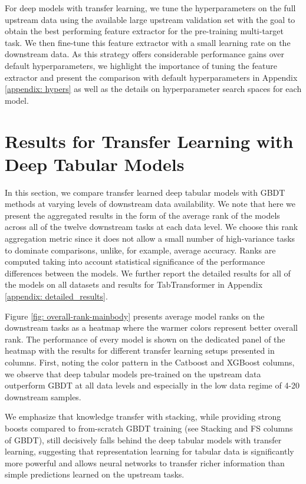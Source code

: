 For deep models with transfer learning, we tune the hyperparameters on the full upstream data using the available large upstream validation set with the goal to obtain the best performing feature extractor for the pre-training multi-target task. We then fine-tune this feature extractor with a small learning rate on the downstream data. As this strategy offers considerable performance gains over default hyperparameters, we highlight the importance of tuning the feature extractor and present the comparison with default hyperparameters in Appendix \ref{appendix: hypers} as well as the details on hyperparameter search spaces for each model.

\section{Results for Transfer Learning with Deep Tabular Models}\label{mainbody: main_results}

In this section, we compare transfer learned deep tabular models with GBDT methods at varying levels of downstream data availability. We note that here we present the aggregated results in the form of the average rank of the models across all of the twelve downstream tasks at each data level. We choose this rank aggregation metric since it does not allow a small number of high-variance tasks to dominate comparisons, unlike, for example, average accuracy. Ranks are computed taking into account statistical significance of the performance differences between the models. We further report the detailed results for all of the models on all datasets and results for TabTransformer in Appendix \ref{appendix: detailed_results}.

Figure \ref{fig: overall-rank-mainbody} presents average model ranks on the downstream tasks as a heatmap where the warmer colors represent better overall rank. The performance of every model is shown on the dedicated panel of the heatmap with the results for different transfer learning setups presented in columns. First, noting the color pattern in the Catboost and XGBoost columns, we observe that deep tabular models pre-trained on the upstream data outperform GBDT at all data levels and especially in the low data regime of 4-20 downstream samples. 

We emphasize that knowledge transfer with stacking, while providing strong boosts compared to from-scratch GBDT training (see Stacking and FS columns of GBDT), still decisively falls behind the deep tabular models with transfer learning, suggesting that representation learning for tabular data is significantly more powerful and allows neural networks to transfer richer information than simple predictions learned on the upstream tasks. 

